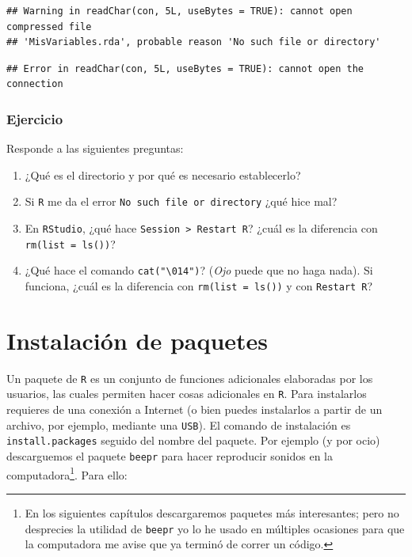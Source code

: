 \documentclass[]{tufte-book}
\begin{document}
\begin{verbatim}
## Warning in readChar(con, 5L, useBytes = TRUE): cannot open compressed file
## 'MisVariables.rda', probable reason 'No such file or directory'
\end{verbatim}

\begin{verbatim}
## Error in readChar(con, 5L, useBytes = TRUE): cannot open the connection
\end{verbatim}

\hypertarget{ejercicio-2}{%
\subsection{Ejercicio}\label{ejercicio-2}}

Responde a las siguientes preguntas:

\begin{enumerate}
\def\labelenumi{\arabic{enumi}.}
\item
  ¿Qué es el directorio y por qué es necesario establecerlo?
\item
  Si \texttt{R} me da el error
  \texttt{\textquotesingle{}No\ such\ file\ or\ directory\textquotesingle{}}
  ¿qué hice mal?
\item
  En \texttt{RStudio}, ¿qué hace
  \texttt{Session\ \textgreater{}\ Restart\ R}? ¿cuál es la diferencia
  con \texttt{rm(list\ =\ ls())}?
\item
  ¿Qué hace el comando \texttt{cat("\textbackslash{}014")}? (\emph{Ojo}
  puede que no haga nada). Si funciona, ¿cuál es la diferencia con
  \texttt{rm(list\ =\ ls())} y con \texttt{Restart\ R}?
\end{enumerate}

\hypertarget{instalaciuxf3n-de-paquetes}{%
\chapter{Instalación de paquetes}\label{instalaciuxf3n-de-paquetes}}

Un paquete de \texttt{R} es un conjunto de funciones adicionales
elaboradas por los usuarios, las cuales permiten hacer cosas adicionales
en \texttt{R}. Para instalarlos requieres de una conexión a Internet (o
bien puedes instalarlos a partir de un archivo, por ejemplo, mediante
una \texttt{USB}). El comando de instalación es
\texttt{install.packages} seguido del nombre del paquete. Por ejemplo (y
por ocio) descarguemos el paquete \texttt{beepr} para hacer reproducir
sonidos en la computadora\footnote{En los siguientes capítulos
  descargaremos paquetes más interesantes; pero no desprecies la
  utilidad de \texttt{beepr} yo lo he usado en múltiples ocasiones para
  que la computadora me avise que ya terminó de correr un código.}. Para
ello:
\end{document}
